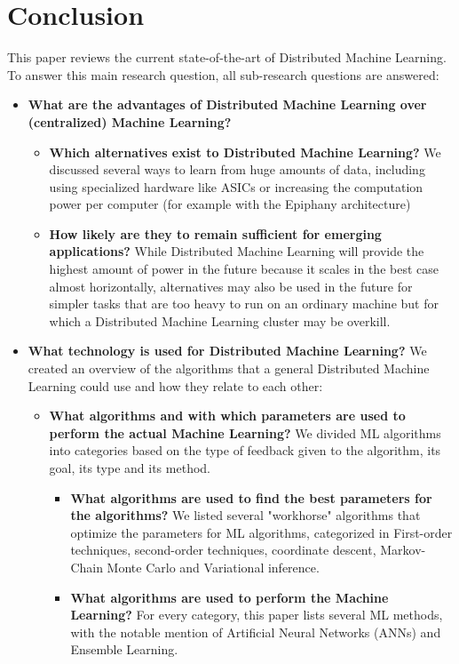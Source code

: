 \section{Conclusion}
This paper reviews the current state-of-the-art of Distributed Machine Learning. To answer this main research question, all sub-research questions are answered:
\begin{itemize}
	\item \textbf{What are the advantages of Distributed Machine Learning over (centralized) Machine Learning?}
	\begin{itemize}
		\item \textbf{Which alternatives exist to Distributed Machine Learning?} We discussed several ways to learn from huge amounts of data, including using specialized hardware like ASICs or increasing the computation power per computer (for example with the Epiphany architecture)
		\item \textbf{How likely are they to remain sufficient for emerging applications?} While Distributed Machine Learning will provide the highest amount of power in the future because it scales in the best case almost horizontally, alternatives may also be used in the future for simpler tasks that are too heavy to run on an ordinary machine but for which a Distributed Machine Learning cluster may be overkill.
	\end{itemize}
	\item \textbf{What technology is used for Distributed Machine Learning?} We created an overview of the algorithms that a general Distributed Machine Learning could use and how they relate to each other:
	\begin{itemize}
		\item \textbf{What algorithms and with which parameters are used to perform the actual Machine Learning?} We divided ML algorithms into categories based on the type of feedback given to the algorithm, its goal, its type and its method.
		\begin{itemize}
			\item \textbf{What algorithms are used to find the best parameters for the algorithms?} We listed several "workhorse" algorithms that optimize the parameters for ML algorithms, categorized in First-order techniques, second-order techniques, coordinate descent, Markov-Chain Monte Carlo and Variational inference.
			\item \textbf{What algorithms are used to perform the Machine Learning?} For every category, this paper lists several ML methods, with the notable mention of Artificial Neural Networks (ANNs) and Ensemble Learning.

\end{itemize}
\end{itemize}
\end{itemize}
